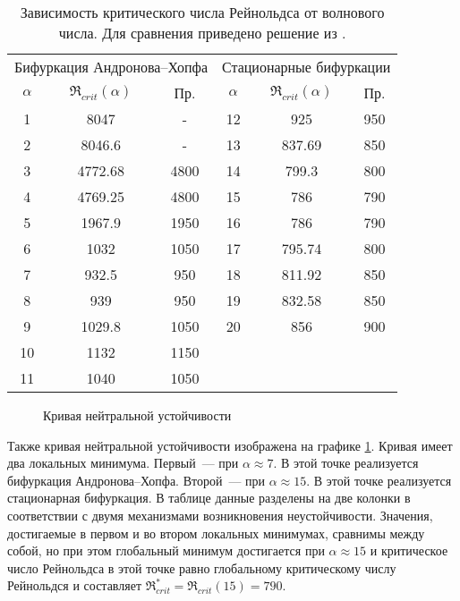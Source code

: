 \begin{table}[htp]
 \begin{tabular}{cccccc}
\hline
\hline
  \multicolumn{3}{c}{Бифуркация Андронова--Хопфа} & \multicolumn{3}{c}{Стационарные бифуркации} \\
  $\alpha$&	$\Re_{crit}(\alpha)$ \cite{lin-stability}&  Пр.&	$\alpha$&	$\Re_{crit}(\alpha)$ \cite{lin-stability}&  Пр. \\
\hline
  1&	8047&		-&	12&	925&		950\\ 
  2&	8046.6&		-&	13&	837.69&		850\\
  3&	4772.68&	4800&	14&	799.3&		800\\
  4&	4769.25&	4800&	15&	786&		790\\
  5&	1967.9&		1950&	16&	786&		790\\
  6&	1032&		1050&	17&	795.74&		800\\
  7&	932.5&		950&	18&	811.92&		850\\
  8&	939&		950&	19&	832.58&		850\\
  9&	1029.8&		1050&	20&	856&		900\\
  10&	1132&		1150\\
  11&	1040&		1050\\
\hline
 \end{tabular}
 \caption{Зависимость критического числа Рейнольдса от волнового числа. Для сравнения приведено решение из \cite{lin-stability}. }
 \label{Re_al}
\end{table}

\begin{figure}
  \center
  
  \caption{Кривая нейтральной устойчивости}
  \label{graph:Re_al}
\end{figure}

Также кривая нейтральной устойчивости изображена на графике \ref{graph:Re_al}. Кривая имеет два локальных минимума. Первый~--- при $\alpha \approx 7 $. В этой точке реализуется бифуркация Андронова--Хопфа. Второй~--- при $\alpha \approx 15$. В этой точке реализуется стационарная бифуркация. В таблице данные разделены на две колонки в соответствии с двумя механизмами возникновения неустойчивости.  Значения, достигаемые в первом и во втором локальных минимумах, сравнимы между собой, но при этом глобальный минимум достигается при $\alpha \approx 15$ и критическое число Рейнольдса в этой точке равно глобальному критическому числу Рейнольдся и составляет $\Re_{crit}^* = \Re_{crit}(15) = 790$. 

